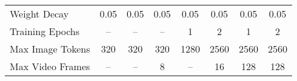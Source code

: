 \begin{table*}[t]
{{\begin{tabular}{l|ccc|ccc|c}
Weight Decay                      & 0.05       & 0.05         & 0.05       & 0.05             & 0.05              & 0.05             & 0.05             \\
Training Epochs                   & --         & --           & --          & 1               & 2                 & 1               & 2                \\
Max Image Tokens              & 320         & 320           & 320         & 1280               & 2560                & 2560               & 2560               \\
Max Video Frames              & --         & --           & 8         & --               & 16                & 128               & 128               \\
\bottomrule
\end{tabular}
}
}
\label{tab:app_train_hyperparameter}
\end{table*}











